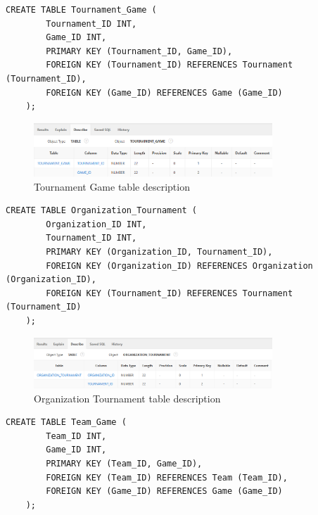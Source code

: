 \begin{lstlisting}[caption={Create Tournament Game table}, label={lst:create_tournament_game}]
    CREATE TABLE Tournament_Game (
        Tournament_ID INT,
        Game_ID INT,
        PRIMARY KEY (Tournament_ID, Game_ID),
        FOREIGN KEY (Tournament_ID) REFERENCES Tournament (Tournament_ID),
        FOREIGN KEY (Game_ID) REFERENCES Game (Game_ID)
    );
    \end{lstlisting}
\begin{figure}[H]
    \centering
    \includegraphics[width=0.8\textwidth]{images/TableDesc/TOURNAMENT_GAME.png}
    \caption{Tournament Game table description}
    \label{fig:tournament_game_table}
\end{figure}
\begin{lstlisting}[caption={Create Organization Tournament table}, label={lst:create_organization_tournament}]
    CREATE TABLE Organization_Tournament (
        Organization_ID INT,
        Tournament_ID INT,
        PRIMARY KEY (Organization_ID, Tournament_ID),
        FOREIGN KEY (Organization_ID) REFERENCES Organization (Organization_ID),
        FOREIGN KEY (Tournament_ID) REFERENCES Tournament (Tournament_ID)
    );
    \end{lstlisting}
\begin{figure}[H]
    \centering
    \includegraphics[width=0.8\textwidth]{images/TableDesc/ORGANIZATION_TOURNAMENT.png}
    \caption{Organization Tournament table description}
    \label{fig:organization_tournament_table}
\end{figure}
\clearpage
\begin{lstlisting}[caption={Create Team Game table}, label={lst:create_team_game}]
    CREATE TABLE Team_Game (
        Team_ID INT,
        Game_ID INT,
        PRIMARY KEY (Team_ID, Game_ID),
        FOREIGN KEY (Team_ID) REFERENCES Team (Team_ID),
        FOREIGN KEY (Game_ID) REFERENCES Game (Game_ID)
    );
    \end{lstlisting}
